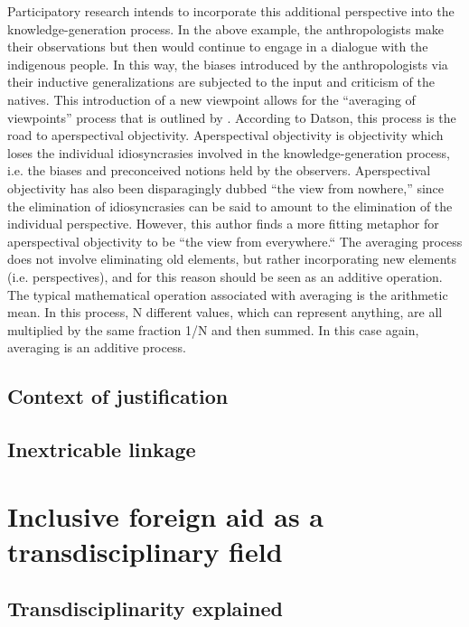 \documentclass[a4paper]{article}
\begin{document}
Participatory research intends to incorporate this additional perspective into
the knowledge-generation process. In the above example, the anthropologists
make their observations but then would continue to engage in a dialogue with
the indigenous people. In this way, the biases introduced by the
anthropologists via their inductive generalizations are subjected to the input
and criticism of the natives. This introduction of a new viewpoint allows for
the ``averaging of viewpoints'' process that is outlined by
\cite{datson1992objectivity}. According to Datson, this process is the road to
aperspectival objectivity.  Aperspectival objectivity is objectivity which
loses the individual idiosyncrasies involved in the knowledge-generation
process, i.e. the biases and preconceived notions held by the observers.
Aperspectival objectivity has also been disparagingly dubbed ``the view from
nowhere,'' since the elimination of idiosyncrasies can be said to amount to the
elimination of the individual perspective. However, this author finds a more
fitting metaphor for aperspectival objectivity to be ``the view from
everywhere.`` The averaging process does not involve eliminating old elements,
but rather incorporating new elements (i.e.  perspectives), and for this reason
should be seen as an additive operation.  The typical mathematical operation
associated with averaging is the arithmetic mean. In this process, N different
values, which can represent anything, are all multiplied by the same fraction
1/N and then summed. In this case again, averaging is an additive process.

\subsection{Context of justification}

\subsection{Inextricable linkage}

\newpage
\section{Inclusive foreign aid as a transdisciplinary field}

\subsection{Transdisciplinarity explained}
\end{document}
